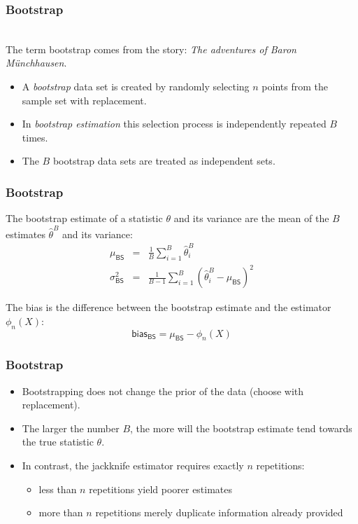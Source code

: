 \begin{frame}
  \frametitle{Bootstrap}

  \\
	The term bootstrap comes from the story: \textit{The adventures of Baron M{\"u}nchhausen}.
  \pspread

  \begin{itemize}
    \item A \textit{bootstrap} data set is created by randomly selecting $n$ points from the sample set with replacement. \pause
    \item In \textit{bootstrap estimation} this selection process is independently repeated $B$ times. \pause
    \item The $B$ bootstrap data sets are treated as independent sets.
  \end{itemize}
\end{frame}


\begin{frame}
  \frametitle{Bootstrap \cont}
  
  The bootstrap estimate of a statistic $\theta$ and its variance are the mean of the $B$ estimates $\hat{\theta}^B$ and its variance:
  \begin{eqnarray*}
    \mu_{\mathsf{BS}}      &=& \frac{1}{B} \sum_{i=1}^B \hat{\theta}^B_i \\
    \sigma^2_{\mathsf{BS}} &=& \frac{1}{B-1} \sum_{i=1}^B \left( \hat{\theta}^B_i - \mu_{\mathsf{BS}} \right)^2
  \end{eqnarray*}
  \pspread

  The bias is the difference between the bootstrap estimate and the estimator $\phi_n(X)$:
  \begin{displaymath}
    \mathsf{bias}_{\mathsf{BS}} = \mu_{\mathsf{BS}} - \phi_n(X)
  \end{displaymath}
\end{frame}


\begin{frame}
  \frametitle{Bootstrap \cont}


  \begin{itemize}
    \item Bootstrapping does not change the prior of the data (choose with replacement). \pause
    \item The larger the number $B$, the more will the bootstrap estimate tend towards the true statistic $\theta$. \pause
    \item In contrast, the jackknife estimator requires exactly $n$ repetitions: 
      \begin{itemize}
        \item less than $n$ repetitions yield poorer estimates
        \item more than $n$ repetitions merely duplicate information already provided
      \end{itemize}
  \end{itemize}
\end{frame}


